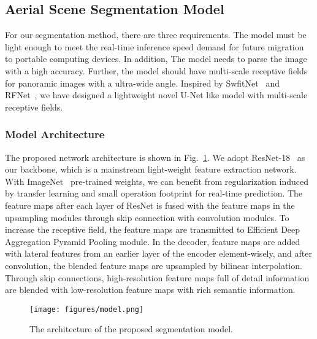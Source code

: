 \documentclass[letterpaper, 10 pt, conference]{ieeeconf}
\begin{document}
\subsection{Aerial Scene Segmentation Model}
 
For our segmentation method, there are three requirements. The model must be light enough to meet the real-time inference speed demand for future migration to portable computing devices. In addition, The model needs to parse the image with a high accuracy. Further, the model should have multi-scale receptive fields for panoramic images with a ultra-wide angle. Inspired by SwfitNet~\cite{swiftnet} and RFNet~\cite{rfnet}, we have designed a lightweight novel U-Net like model with multi-scale receptive fields.

\subsubsection{Model Architecture}

The proposed network architecture is shown in Fig.~\ref{fig:model}.
We adopt ResNet-18~\cite{resnet} as our backbone, which is a mainstream light-weight feature extraction network.
With ImageNet~\cite{russakovsky2015imagenet} pre-trained weights, we can benefit from regularization induced by transfer learning and small operation footprint for real-time prediction.
The feature maps after each layer of ResNet is fused with the feature maps in the upsampling modules through skip connection with  convolution modules.
To increase the receptive field, the feature maps are transmitted to Efficient Deep Aggregation Pyramid Pooling module.
In the decoder, feature maps are added with lateral features from an earlier layer of the encoder element-wisely, and after convolution, the blended feature maps are upsampled by bilinear interpolation. Through skip connections, high-resolution feature maps full of detail information are blended with low-resolution feature maps with rich semantic information.

\begin{figure}[h]
    \centerline{\texttt{[image: figures/model.png]}}
    \caption{The architecture of the proposed segmentation model.}
    \label{fig:model}
\end{figure}
\end{document}
